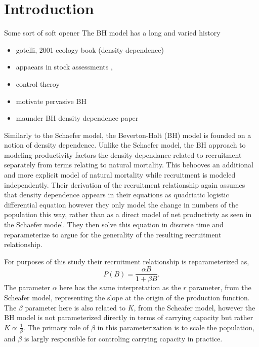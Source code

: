 %
\section{\color{red}Introduction\label{ptInt}}

%
{\color{red}Some sort of soft opener}
The BH model has a long \cite{holden_beverton_1995} and varied history 
\begin{itemize}
\item gotelli, 2001 ecology book (density dependence)
\item appaears in stock assessments \cite{ss3}, \cite{black} \cite{other assessments of the last cycle?}
\item control theroy \cite{}
\item motivate pervasive BH \cite{holden}
\item maunder BH density dependence paper
\end{itemize}

%
Similarly to the Schaefer model, the Beverton-Holt (BH) model 
\cite{beverton_dynamics_1957} is founded on a notion of density dependence. 
Unlike the Schaefer model, the BH approach to modeling productivity factors the 
density dependance related to recruitment separately from terms relating to 
natural mortality. This behooves an additional and more explicit model of natural \cite{beverton_holt_1959} 
mortality while recruitment is modeled independently. %
Their derivation of the recruitment relationship again assumes that density 
dependence appears in their equations as quadriatic logistic differential equation %
however they only model the change in numbers of the population this way, rather 
than as a direct model of net productivty as seen in the Schaefer model. They 
then solve this equation in discrete time and reparameterize to argue for the 
generality of the resulting recruitment relationship. 

%
For purposes of this study their recruitment relationship is 
reparameterized as, %
%
\begin{equation}
P(B) = \frac{\alpha B}{1+\beta B}.
\end{equation}
%
The parameter $\alpha$ here has the same interpretation as the $r$ parameter, 
from the Scheafer model, representing the slope at the origin of the 
production function. The $\beta$ parameter here is also related to $K$, 
from the Scheafer model, however the BH model is not parameterized 
directly in terms of carrying capacity but rather $K\propto\frac{1}{\beta}$. 
The primary role of $\beta$ in this parameterization is to scale the 
population, and $\beta$ is largly responsible for controling carrying capacity 
in practice. 

